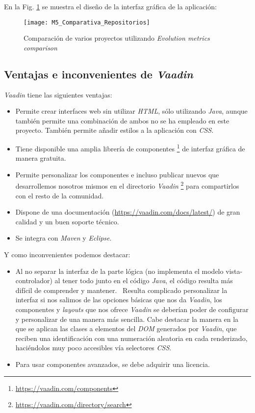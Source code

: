 En la Fig. \ref{fig:M5_Comparativa_Repositorios} se muestra el diseño de la interfaz gráfica de la aplicación:

\begin{figure}[!h]
	\centering
	\texttt{[image: M5\_Comparativa\_Repositorios]}
	\caption{Comparación de varios proyectos utilizando \textit{Evolution metrics comparison}}\label{fig:M5_Comparativa_Repositorios}
\end{figure}
\FloatBarrier

\newpage
\subsection{Ventajas e inconvenientes de \textit{Vaadin}}
\textit{Vaadin} tiene las siguientes ventajas:
\begin{itemize}
	\item Permite crear interfaces web sin utilizar \textit{HTML}, sólo utilizando \textit{Java}, aunque también permite una combinación de ambos no se ha empleado en este proyecto. También permite añadir estilos a la aplicación con \textit{CSS}.
	\item Tiene disponible una amplia librería de componentes \footnote{\url{https://vaadin.com/components}} de interfaz gráfica de manera gratuita.
	\item Permite personalizar los componentes e incluso publicar nuevos que desarrollemos nosotros mismos en el directorio \textit{Vaadin} \footnote{\url{https://vaadin.com/directory/search}} para compartirlos con el resto de la comunidad.
	\item Dispone de una documentación (\url{https://vaadin.com/docs/latest/}) de gran calidad y un buen soporte técnico.
	\item Se integra con \textit{Maven} y \textit{Eclipse}.
\end{itemize}

Y como inconvenientes podemos destacar:
\begin{itemize}
	\item Al no separar la interfaz de la parte lógica (no implementa el modelo vista-controlador) al tener todo junto en el código \textit{Java}, el código resulta más difícil de comprender y mantener.
	\ Resulta complicado personalizar la interfaz si nos salimos de las opciones básicas que nos da \textit{Vaadin}, los componentes y \textit{layouts} que nos ofrece \textit{Vaadin} se deberían poder de configurar y personalizar de una manera más sencilla. Cabe destacar la manera en la que se aplican las clases a elementos del \textit{DOM} generados por \textit{Vaadin}, que reciben una identificación con una numeración aleatoria en cada renderizado, haciéndolos muy poco accesibles vía selectores \textit{CSS}.
	\item Para usar componentes avanzados, se debe adquirir una licencia.
\end{itemize}


